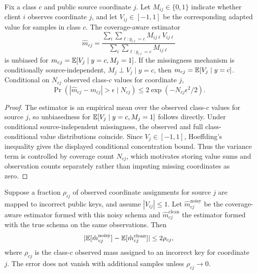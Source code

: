 \begin{theorem}
\label{thm:coverage-estimator}
Fix a class \(c\) and public source coordinate \(j\). Let \(M_{ij}\in\{0,1\}\) indicate whether client \(i\) observes coordinate \(j\), and let \(V_{ij}\in[-1,1]\) be the corresponding adapted value for samples in class \(c\). The coverage-aware estimator
\begin{equation}
    \hat{m}_{cj}
    =
    \frac{\sum_i\sum_{\ell:y_{i\ell}=c}M_{ij\ell}V_{ij\ell}}
    {\sum_i\sum_{\ell:y_{i\ell}=c}M_{ij\ell}}
\end{equation}
is unbiased for \(m_{cj}=\mathbb{E}[V_j\mid y=c,M_j=1]\). If the missingness mechanism is conditionally source-independent, \(M_j\perp V_j\mid y=c\), then \(m_{cj}=\mathbb{E}[V_j\mid y=c]\). Conditional on \(N_{cj}\) observed class-\(c\) values for coordinate \(j\),
\begin{equation}
    \Pr(|\hat{m}_{cj}-m_{cj}|>\epsilon\mid N_{cj})
    \le 2\exp(-N_{cj}\epsilon^2/2).
\end{equation}
\end{theorem}

\begin{proof}
The estimator is an empirical mean over the observed class-\(c\) values for source \(j\), so unbiasedness for \(\mathbb{E}[V_j\mid y=c,M_j=1]\) follows directly. Under conditional source-independent missingness, the observed and full class-conditional value distributions coincide. Since \(V_j\in[-1,1]\), Hoeffding's inequality gives the displayed conditional concentration bound. Thus the variance term is controlled by coverage count \(N_{cj}\), which motivates storing value sums and observation counts separately rather than imputing missing coordinates as zero.
\end{proof}

\begin{theorem}
\label{thm:noisy-schema}
Suppose a fraction \(\rho_{ij}\) of observed coordinate assignments for source \(j\) are mapped to incorrect public keys, and assume \(|V_{ij}|\le1\). Let \(\hat{m}_{cj}^{\mathrm{noisy}}\) be the coverage-aware estimator formed with this noisy schema and \(\hat{m}_{cj}^{\mathrm{clean}}\) the estimator formed with the true schema on the same observations. Then
\begin{equation}
    |\mathbb{E}[\hat{m}_{cj}^{\mathrm{noisy}}]-\mathbb{E}[\hat{m}_{cj}^{\mathrm{clean}}]|
    \le 2\rho_{cj},
\end{equation}
where \(\rho_{cj}\) is the class-\(c\) observed mass assigned to an incorrect key for coordinate \(j\). The error does not vanish with additional samples unless \(\rho_{cj}\to0\).
\end{theorem}

